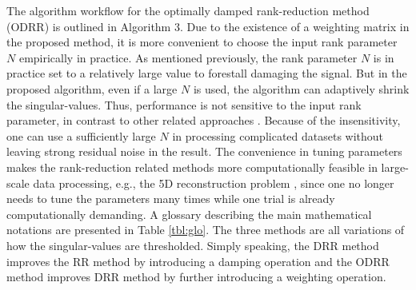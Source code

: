 {\begin{equation}
\end{equation}
The algorithm workflow for the optimally damped rank-reduction method (ODRR) is outlined in Algorithm 3. Due to the existence of a weighting matrix in the proposed method, it is more convenient to choose the input rank parameter $N$ empirically in practice. As mentioned previously, the rank parameter $N$ is in practice set to a relatively large value to forestall damaging the signal. But in the proposed algorithm, even if a large $N$ is used, the algorithm can adaptively shrink the singular-values. Thus,  performance is not sensitive to the input rank parameter, in contrast to other related approaches \cite[]{mssa}. Because of the insensitivity, one can use a sufficiently large $N$ in processing complicated datasets without leaving strong residual noise in the result. The convenience in tuning parameters makes the rank-reduction related methods more computationally feasible in large-scale data processing, e.g., the 5D reconstruction problem \cite[]{yangkang2019gji5d}, since one no longer needs to tune the parameters many times while one trial is already computationally demanding.  A glossary describing the main mathematical notations are presented in Table \ref{tbl:glo}. The three methods are all variations of how the singular-values are thresholded. Simply speaking, the DRR method improves the RR method by introducing a damping operation and the ODRR method improves DRR method by further introducing a weighting operation.}

